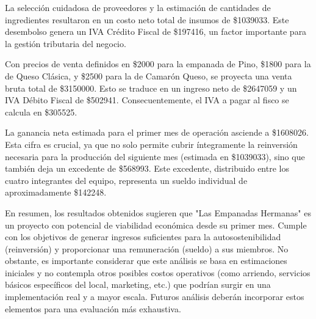 \documentclass[12pt]{article}
\begin{document}
La selección cuidadosa de proveedores y la estimación de cantidades de ingredientes resultaron en un costo neto total de insumos de \$\num{1039033}. Este desembolso genera un IVA Crédito Fiscal de \$\num{197416}, un factor importante para la gestión tributaria del negocio.

Con precios de venta definidos en \$\num{2000} para la empanada de Pino, \$\num{1800} para la de Queso Clásica, y \$\num{2500} para la de Camarón Queso, se proyecta una venta bruta total de \$\num{3150000}. Esto se traduce en un ingreso neto de \$\num{2647059} y un IVA Débito Fiscal de \$\num{502941}. Consecuentemente, el IVA a pagar al fisco se calcula en \$\num{305525}.

La ganancia neta estimada para el primer mes de operación asciende a \$\num{1608026}. Esta cifra es crucial, ya que no solo permite cubrir íntegramente la reinversión necesaria para la producción del siguiente mes (estimada en \$\num{1039033}), sino que también deja un excedente de \$\num{568993}. Este excedente, distribuido entre los cuatro integrantes del equipo, representa un sueldo individual de aproximadamente \$\num{142248}.

En resumen, los resultados obtenidos sugieren que "Las Empanadas Hermanas" es un proyecto con potencial de viabilidad económica desde su primer mes. Cumple con los objetivos de generar ingresos suficientes para la autosostenibilidad (reinversión) y proporcionar una remuneración (sueldo) a sus miembros. No obstante, es importante considerar que este análisis se basa en estimaciones iniciales y no contempla otros posibles costos operativos (como arriendo, servicios básicos específicos del local, marketing, etc.) que podrían surgir en una implementación real y a mayor escala. Futuros análisis deberán incorporar estos elementos para una evaluación más exhaustiva.
\end{document}

